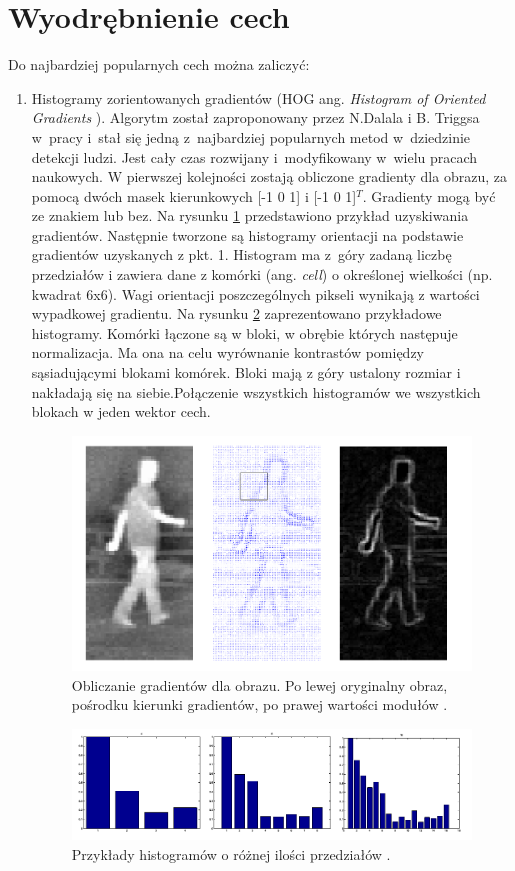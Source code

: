 \section{Wyodrębnienie cech}

Do najbardziej popularnych cech można zaliczyć:

\begin{enumerate}
\item Histogramy zorientowanych gradientów (HOG ang. \textit{Histogram of Oriented Gradients }).
Algorytm został zaproponowany przez N.Dalala i B. Triggsa w~pracy \cite{dalal2005histograms} i~stał się jedną z~najbardziej popularnych metod w~dziedzinie detekcji ludzi. 
Jest cały czas rozwijany i~modyfikowany w~wielu pracach naukowych.
W pierwszej kolejności zostają obliczone gradienty dla obrazu, za pomocą dwóch masek kierunkowych [-1 0 1] i [-1 0 1]$^T$. Gradienty mogą być ze znakiem lub bez. Na rysunku \ref{fig:hog} przedstawiono przykład uzyskiwania gradientów. Następnie tworzone są histogramy orientacji na podstawie gradientów uzyskanych z pkt. 1. Histogram ma z~góry zadaną liczbę przedziałów i zawiera dane z komórki (ang. \textit{cell}) o określonej wielkości (np. kwadrat 6x6). Wagi orientacji poszczególnych pikseli wynikają z wartości wypadkowej gradientu. Na rysunku \ref{fig:hog2} zaprezentowano przykładowe histogramy.
Komórki łączone są w bloki, w obrębie których następuje normalizacja. Ma ona na celu wyrównanie kontrastów pomiędzy sąsiadującymi blokami komórek. Bloki mają z góry ustalony rozmiar i nakładają się na siebie.Połączenie wszystkich histogramów we wszystkich blokach w jeden wektor cech.

\begin{figure}
\centering
\includegraphics[width=0.5\linewidth]{images/hog}
\caption[Obliczanie gradientów dla obrazu.]{Obliczanie gradientów dla obrazu. Po lewej oryginalny obraz, pośrodku kierunki gradientów, po prawej wartości modułów \cite{suard2006pedestrian}.}
\label{fig:hog}
\end{figure}

\begin{figure}
\centering
\includegraphics[width=0.7\linewidth]{images/hog2}
\caption[Przykładowe histogramy]{Przykłady histogramów o różnej ilości przedziałów \cite{suard2006pedestrian}.}
\label{fig:hog2}
\end{figure}


\end{enumerate}
